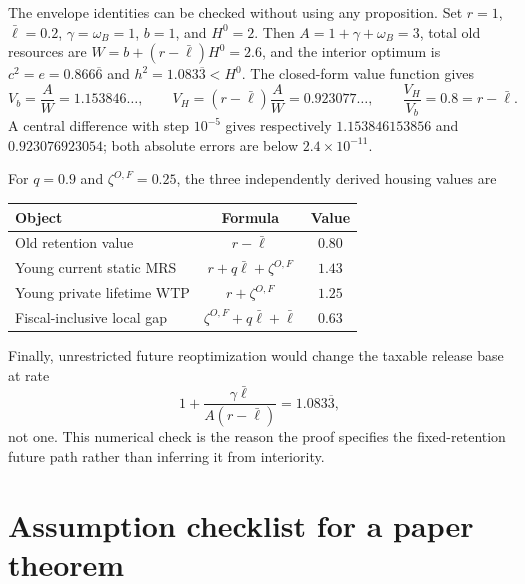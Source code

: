 \documentclass[11pt]{article}
\newcommand{\1}{\mathbf 1}
\newcommand{\ellbar}{\bar\ell}
\begin{document}
The envelope identities can be checked without using any proposition. Set
$r=1$, $\ellbar=0.2$, $\gamma=\omega_B=1$, $b=1$, and $H^0=2$. Then
$A=1+\gamma+\omega_B=3$, total old resources are
$W=b+(r-\ellbar)H^0=2.6$, and the interior optimum is
$c^2=e=0.866\overline6$ and $h^2=1.083\overline3<H^0$. The closed-form value
function gives
\begin{equation}
V_b=\frac{A}{W}=1.153846\ldots,
\qquad
V_H=(r-\ellbar)\frac{A}{W}=0.923077\ldots,
\qquad
\frac{V_H}{V_b}=0.8=r-\ellbar.
\end{equation}
A central difference with step $10^{-5}$ gives respectively
$1.153846153856$ and $0.923076923054$; both absolute errors are below
$2.4\times10^{-11}$.

For $q=0.9$ and $\zeta^{O,F}=0.25$, the three independently derived housing
values are
\begin{center}
\renewcommand{\arraystretch}{1.12}
\begin{tabular}{@{}lcc@{}}
\toprule
Object & Formula & Value \\
\midrule
Old retention value & $r-\ellbar$ & $0.80$ \\
Young current static MRS & $r+q\ellbar+\zeta^{O,F}$ & $1.43$ \\
Young private lifetime WTP & $r+\zeta^{O,F}$ & $1.25$ \\
Fiscal-inclusive local gap & $\zeta^{O,F}+q\ellbar+\ellbar$ & $0.63$ \\
\bottomrule
\end{tabular}
\end{center}
Finally, unrestricted future reoptimization would change the taxable release
base at rate
\begin{equation}
1+\frac{\gamma\ellbar}{A(r-\ellbar)}=1.083\overline3,
\end{equation}
not one. This numerical check is the reason the proof specifies the
fixed-retention future path rather than inferring it from interiority.

\section{Assumption checklist for a paper theorem}
\end{document}
